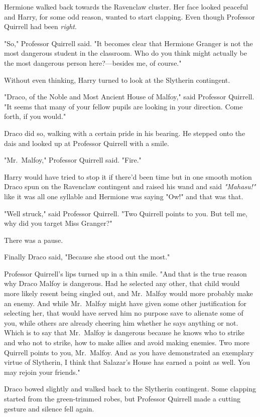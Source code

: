 Hermione walked back towards the Ravenclaw cluster. Her face looked peaceful
and Harry, for some odd reason, wanted to start clapping. Even though Professor
Quirrell had been \emph{right}.

"So," Professor Quirrell said. "It becomes clear that Hermione Granger is not
the most dangerous student in the classroom. Who do you think might actually be
the most dangerous person here?---besides me, of course."

Without even thinking, Harry turned to look at the Slytherin contingent.

"Draco, of the Noble and Most Ancient House of Malfoy," said Professor
Quirrell. "It seems that many of your fellow pupils are looking in your
direction. Come forth, if you would."

Draco did so, walking with a certain pride in his bearing. He stepped onto the
dais and looked up at Professor Quirrell with a smile.

"Mr.~Malfoy," Professor Quirrell said. "Fire."

Harry would have tried to stop it if there'd been time but in one smooth motion
Draco spun on the Ravenclaw contingent and raised his wand and said
\emph{"Mahasu!"} like it was all one syllable and Hermione was saying "Ow!" and
that was that.

"Well struck," said Professor Quirrell. "Two Quirrell points to you. But tell
me, why did you target Miss Granger?"

There was a pause.

Finally Draco said, "Because she stood out the most."

Professor Quirrell's lips turned up in a thin smile. "And that is the true
reason why Draco Malfoy is dangerous. Had he selected any other, that child
would more likely resent being singled out, and Mr.~Malfoy would more probably
make an enemy. And while Mr.~Malfoy might have given some other justification
for selecting her, that would have served him no purpose save to alienate some
of you, while others are already cheering him whether he says anything or not.
Which is to say that Mr.~Malfoy is dangerous because he knows who to strike and
who not to strike, how to make allies and avoid making enemies. Two more
Quirrell points to you, Mr.~Malfoy. And as you have demonstrated an exemplary
virtue of Slytherin, I think that Salazar's House has earned a point as well.
You may rejoin your friends."

Draco bowed slightly and walked back to the Slytherin contingent. Some clapping
started from the green-trimmed robes, but Professor Quirrell made a cutting
gesture and silence fell again.

